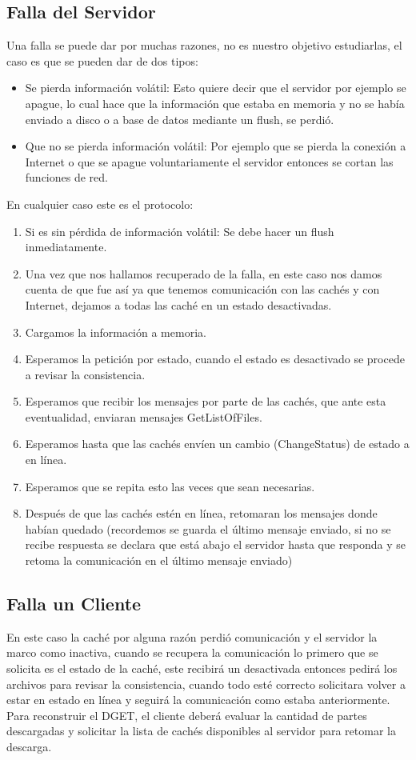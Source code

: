 \subsection{Falla del Servidor}
Una falla se puede dar por muchas razones, no es nuestro objetivo estudiarlas, el caso es que se pueden dar de dos tipos:

\begin{itemize}
\item Se pierda información volátil: Esto quiere decir que el servidor por ejemplo se apague, lo cual hace que la información que estaba en memoria y no se había enviado a disco o a base de datos mediante un flush, se perdió.
\item Que no se pierda información volátil: Por ejemplo que se pierda la conexión a Internet o que se apague voluntariamente el servidor entonces se cortan las funciones de red.
\end{itemize}

En cualquier caso este es el protocolo:

\begin{enumerate}
\item Si es sin pérdida de información volátil: Se debe hacer un flush inmediatamente.
\item Una vez que nos hallamos recuperado de la falla, en este caso nos damos cuenta de que fue así ya que tenemos comunicación con las cachés y con Internet, dejamos a todas las caché en un estado desactivadas.
\item Cargamos la información a memoria.
\item Esperamos la petición por estado, cuando el estado es desactivado se procede a revisar la consistencia.
\item Esperamos que recibir los mensajes por parte de las cachés, que ante esta eventualidad, enviaran mensajes GetListOfFiles.
\item Esperamos hasta que las cachés envíen un cambio (ChangeStatus) de estado a en línea.
\item Esperamos que se repita esto las veces que sean necesarias.
\item Después de que las cachés estén en línea, retomaran los mensajes donde habían quedado (recordemos se guarda el último mensaje enviado, si no se recibe respuesta se declara que está abajo el servidor hasta que responda y se retoma la comunicación en el último mensaje enviado)
\end{enumerate}

\subsection{Falla un Cliente}
En este caso la caché por alguna razón perdió comunicación y el servidor la marco como inactiva, cuando se recupera la comunicación lo primero que se solicita es el estado de la caché, este recibirá un desactivada entonces pedirá los archivos para revisar la consistencia, cuando todo esté correcto solicitara volver a estar en estado en línea y seguirá la comunicación como estaba anteriormente.
Para reconstruir el DGET, el cliente deberá evaluar la cantidad de partes descargadas y solicitar la lista de cachés disponibles al servidor para retomar la descarga.

